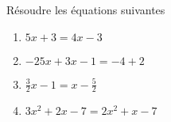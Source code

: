 
Résoudre les équations suivantes
\begin{enumerate}
\item $5x+3=4x-3$
\item $-25x+3x-1=-4+2$
\item $\frac{3}{2}x-1=x-\frac{5}{2}$
\item $3x^2+2x-7=2x^2+x-7$
\end{enumerate}